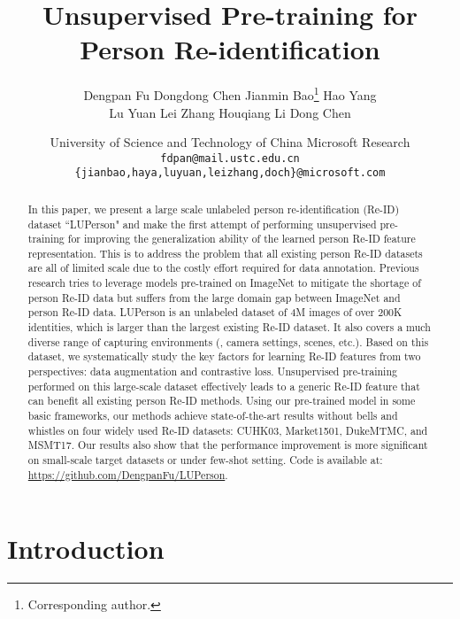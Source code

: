 \documentclass[final]{cvpr}
\begin{document}
\title{Unsupervised Pre-training for Person Re-identification}

\author{Dengpan Fu \quad
		Dongdong Chen \quad
		Jianmin Bao\thanks{Corresponding author.} \quad
		Hao Yang \\
		Lu Yuan \quad
		Lei Zhang \quad
		Houqiang Li \quad
		Dong Chen
		\and 
		University of Science and Technology of China \quad Microsoft Research  \\ {\tt\small fdpan@mail.ustc.edu.cn}   \\
		{\tt\small \{jianbao,haya,luyuan,leizhang,doch\}@microsoft.com}
	}

\maketitle 
\begin{abstract}
In this paper, we present a large scale unlabeled person re-identification (Re-ID) dataset ``LUPerson" and make the first attempt of performing unsupervised pre-training for improving the generalization ability of the learned person Re-ID feature representation. This is to address the problem that all existing person Re-ID datasets are all of limited scale due to the costly effort required for data annotation. Previous research tries to leverage models pre-trained on ImageNet to mitigate the shortage of person Re-ID data but suffers from the large domain gap between ImageNet and person Re-ID data. LUPerson is an unlabeled dataset of 4M images of over 200K identities, which is  larger than the largest existing Re-ID dataset. It also covers a much diverse range of capturing environments (\eg, camera settings, scenes, etc.). Based on this dataset, we systematically study the key factors for learning Re-ID features from two perspectives: data augmentation and contrastive loss. Unsupervised pre-training performed on this large-scale dataset effectively leads to a generic Re-ID feature that can benefit all existing person Re-ID methods. Using our pre-trained model in some basic frameworks, our methods achieve state-of-the-art results without bells and whistles on four widely used Re-ID datasets: CUHK03, Market1501, DukeMTMC, and MSMT17. Our results also show that the performance improvement is more significant on small-scale target datasets or under few-shot setting. Code is available at: \url{https://github.com/DengpanFu/LUPerson}.
\end{abstract}

\section{Introduction}
\label{sec:intro}
\end{document}

